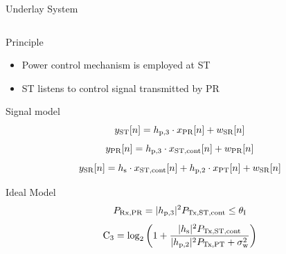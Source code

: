 \documentclass[16pt]{beamer}
\newcommand{\fs}[2]{\fontsize{#1 pt}{#2}\selectfont}
\begin{document}
\begin{frame}[t]{Underlay System}
	\vspace{-4mm}
	\fs{7}{8}
	\begin{columns}
		\begin{column}{0.44\columnwidth}
			\begin{block}{\scriptsize Principle} %
				\begin{itemize}
					\item Power control mechanism is employed at ST 
					\item ST listens to control signal transmitted by PR 
				\end{itemize}
			\end{block}
			\vspace{2mm}
			{
				\begin{block}{\scriptsize Signal model} %
				\begin{equation*}
					y_{\text{ST}}[n] = h_{\text{p,3}} \cdot x_{\text{PR}}[n] + w_{\text{SR}}[n]
				\end{equation*}
				\begin{equation*}
					y_{\text{PR}}[n] = h_{\text{p,3}}  \cdot x_{\text{ST,cont}}[n] + w_{\text{PR}}[n]
				\end{equation*}
				\begin{equation*}
					y_{\text{SR}}[n] = h_{\text{s}} \cdot x_{\text{ST,cont}}[n] + h_{\text{p,2}} \cdot x_{\text{PT}}[n] + w_{\text{SR}}[n]
				\end{equation*}
				\end{block}
				\vspace{2mm}
				\begin{block}{\scriptsize Ideal Model} 
				\begin{equation*}
					P_{\text{Rx,PR}} = |h_{\text{p,3}}|^2 P_{\text{Tx,ST,cont}} \le \theta_{\text{I}}
				\end{equation*}	
				\begin{equation*}
					\ca = \log_2 \left(1 + \frac{\pgs \preg}{ \pgpt \ptranpt + \nps} \right)	

\end{equation*}
\end{block}}
\end{column}
\end{columns}
\end{frame}
\end{document}
